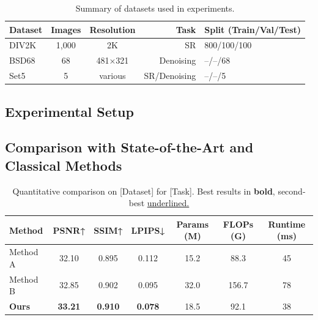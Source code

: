 \documentclass[journal,onecolumn,draftcls]{IEEEtran}
\begin{document}
\begin{table}[t]
  \centering
  \caption{Summary of datasets used in experiments.}
  \label{tab:datasets}
  \begin{tabular}{lccrl}
    \toprule
    \textbf{Dataset} & \textbf{Images} & \textbf{Resolution} &
    \textbf{Task} & \textbf{Split (Train/Val/Test)} \\
    \midrule
    DIV2K & 1,000 & 2K & SR & 800/100/100 \\
    BSD68 & 68 & 481×321 & Denoising & --/--/68 \\
    Set5 & 5 & various & SR/Denoising & --/--/5 \\
    \bottomrule
  \end{tabular}
\end{table}

\subsection{Experimental Setup}
\label{sec:exp-setup}


\subsection{Comparison with State-of-the-Art and Classical Methods}
\label{sec:exp-main}


\begin{table}[t]
  \centering
  \caption{Quantitative comparison on [Dataset] for [Task].
           Best results in \textbf{bold}, second-best \underline{underlined.}}
  \label{tab:main}
  \begin{tabular}{lcccccc}
    \toprule
    \textbf{Method} & \textbf{PSNR↑} & \textbf{SSIM↑} & \textbf{LPIPS↓} &
    \textbf{Params (M)} & \textbf{FLOPs (G)} & \textbf{Runtime (ms)} \\
    \midrule
    Method A \cite{ref1} & 32.10 & 0.895 & 0.112 & 15.2 & 88.3 & 45 \\
    Method B \cite{ref2} & 32.85 & 0.902 & 0.095 & 32.0 & 156.7 & 78 \\
    \textbf{Ours} & \textbf{33.21} & \textbf{0.910} &
    \textbf{0.078} & 18.5 & 92.1 & 38 \\
    \bottomrule
  \end{tabular}
\end{table}
\end{document}
